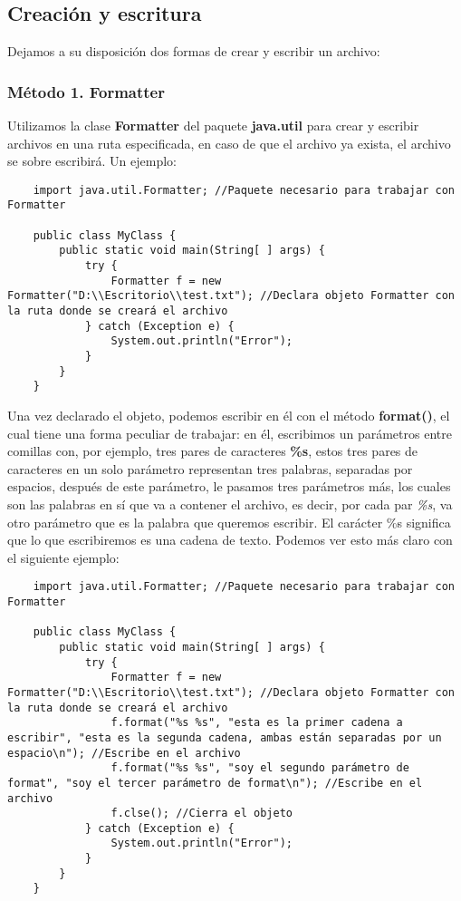 \subsection{Creación y escritura}
Dejamos a su disposición dos formas de crear y escribir un archivo:

\subsubsection{Método 1. Formatter}
Utilizamos la clase \textbf{Formatter} del paquete \textbf{java.util} para crear y escribir archivos en una ruta especificada, en caso de que el archivo ya exista, el archivo se sobre escribirá. Un ejemplo:
\begin{lstlisting}
    import java.util.Formatter; //Paquete necesario para trabajar con Formatter

    public class MyClass {
        public static void main(String[ ] args) {
            try {
                Formatter f = new Formatter("D:\\Escritorio\\test.txt"); //Declara objeto Formatter con la ruta donde se creará el archivo
            } catch (Exception e) {
                System.out.println("Error");
            }
        }
    }
\end{lstlisting}
Una vez declarado el objeto, podemos escribir en él con el método \textbf{format()}, el cual tiene una forma peculiar de trabajar: en él, escribimos un parámetros entre comillas con, por ejemplo, tres pares de caracteres \textbf{\%s}, estos tres pares de caracteres en un solo parámetro representan tres palabras, separadas por espacios, después de este parámetro, le pasamos tres parámetros más, los cuales son las palabras en sí que va a contener el archivo, es decir, por cada par \textit{\%s}, va otro parámetro que es la palabra que queremos escribir. El carácter \%s significa que lo que escribiremos es una cadena de texto. Podemos ver esto más claro con el siguiente ejemplo:
\begin{lstlisting}
    import java.util.Formatter; //Paquete necesario para trabajar con Formatter

    public class MyClass {
        public static void main(String[ ] args) {
            try {
                Formatter f = new Formatter("D:\\Escritorio\\test.txt"); //Declara objeto Formatter con la ruta donde se creará el archivo
                f.format("%s %s", "esta es la primer cadena a escribir", "esta es la segunda cadena, ambas están separadas por un espacio\n"); //Escribe en el archivo
                f.format("%s %s", "soy el segundo parámetro de format", "soy el tercer parámetro de format\n"); //Escribe en el archivo
                f.clse(); //Cierra el objeto
            } catch (Exception e) {
                System.out.println("Error");
            }
        }
    }
\end{lstlisting}

